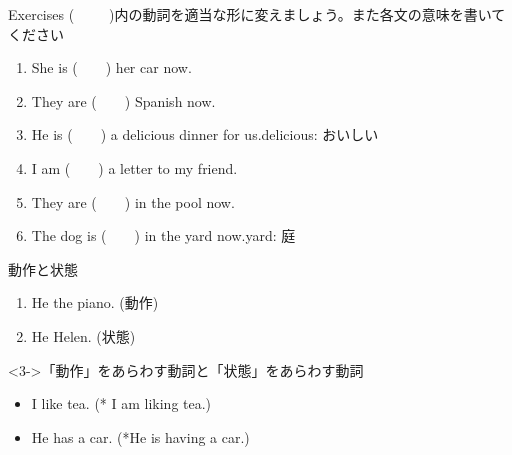 \documentclass[aspectratio=169,xcolor={dvipsnames,table}]{beamer}
\newcommand{\myaudio}[1]{\href{#1}{\faVolumeUp}}
\begin{document}
\begin{frame}[plain]{Exercises}
(~~~~~)内の動詞を適当な形に変えましょう。また各文の意味を書いてください
\begin{enumerate}
 \item She is (~~~~) her car now.
 \item They are (~~~~) Spanish now. 
 \item He is  (~~~~) a delicious dinner for us.\hfill{\small delicious: おいしい}
 \item I am (~~~~) a letter to my friend.
 \item They are (~~~~) in the pool now.
 \item The dog is (~~~~) in the yard now.\hfill{\small yard: 庭}
\end{enumerate} 


\pause

\mbox{}\hfill\myaudio{./audio/021_is_ing_intro_04.mp3}
\end{frame}
\begin{frame}[plain]{動作と状態}
\large
 \begin{enumerate}
  \item<1-> He  the piano. (動作)\hspace{20pt}
  \item<2-> He  Helen. (状態)\hspace{34pt}\\
\hfill{}
 \end{enumerate}

\begin{block}<3->{「動作」をあらわす動詞と「状態」をあらわす動詞}
\begin{itemize}
\begin{itemize}
 \item<7-> I like tea. (* I am liking tea.)
 \item<8-> He has a car. (*He is having a car.)
\end{itemize}

\end{itemize}


\end{block}
\end{frame}
\end{document}
